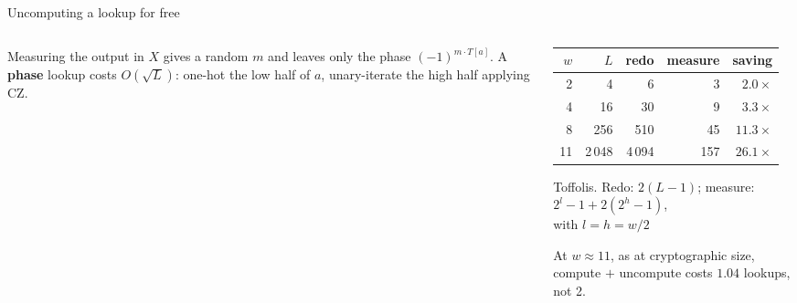 \documentclass[aspectratio=169,11pt]{beamer}
\newcommand{\bundle}[3]{\draw[thick,color=body] (#1-0.07,#2-0.13) -- (#1+0.07,#2+0.13);
  \node[font=\tiny,color=subtle,above right=-1pt] at (#1,#2) {#3};}
\begin{document}
\begin{frame}{Uncomputing a lookup for free}
  \begin{columns}[c]
    \begin{column}{0.5\textwidth}
      \centering
      \vskip2mm
      \raggedright\small
      Measuring the output in $X$ gives a random $m$ and leaves only the phase $(-1)^{m\cdot T[a]}$. A \textbf{phase} lookup costs $O(\sqrt L)$: one-hot the low half of $a$, unary-iterate the high half applying CZ.
    \end{column}
    \begin{column}{0.46\textwidth}
      \centering\footnotesize
      \renewcommand{\arraystretch}{1.12}
      \begin{tabular}{@{}rrrrr@{}}
        \toprule
        $w$ & $L$ & redo & measure & saving \\
        \midrule
        2 & 4 & 6 & 3 & $2.0\times$ \\
        4 & 16 & 30 & 9 & $3.3\times$ \\
        8 & 256 & 510 & 45 & $11.3\times$ \\
        11 & 2\,048 & 4\,094 & 157 & $\mathbf{26.1\times}$ \\
        \bottomrule
      \end{tabular}\par
      {\scriptsize Toffolis. Redo: $2(L-1)$; measure: $2^l-1+2(2^h-1)$,\\ with $l=h=w/2$}
      \vskip2mm
      \begin{greyblock}[fontupper=\small]
        At $w\approx11$, as at cryptographic size, compute $+$ uncompute costs $1.04$ lookups, not 2.
      \end{greyblock}
    \end{column}
  \end{columns}
\end{frame}
\end{document}
